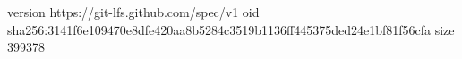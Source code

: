 version https://git-lfs.github.com/spec/v1
oid sha256:3141f6e109470e8dfe420aa8b5284c3519b1136ff445375ded24e1bf81f56cfa
size 399378
